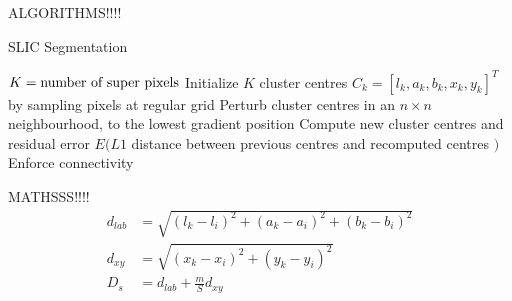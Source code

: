 ALGORITHMS!!!!
\begin{algorithm}[t]
\caption{SLIC Segmentation}
\label{alg:slic}
\begin{algorithmic}[1]
\REQUIRE $K=\textmd{number of super pixels}$
\STATE Initialize $K$ cluster centres $C_k = [l_k, a_k, b_k, x_k, y_k]^T$ by sampling pixels at regular grid
\STATE Perturb cluster centres in an $n\times n$ neighbourhood, to the lowest gradient position
\REPEAT 
{}
\ENDFOR
\STATE Compute new cluster centres and residual error $E(L1 $ distance between previous centres and recomputed centres $)$
\STATE Enforce connectivity
\end{algorithmic}
\end{algorithm}


MATHSSS!!!!
\begin{align}\label{eq:distanceSLIC}
\nonumber d_{lab} &=  \sqrt{(l_k-l_i)^2 + (a_k-a_i)^2 + (b_k-b_i)^2}\\
\nonumber d_{xy}  &=  \sqrt{(x_k-x_i)^2 + (y_k-y_i)^2 }\\
D_{s}   &= d_{lab} + \frac{m}{S} d_{xy}
\end{align}

